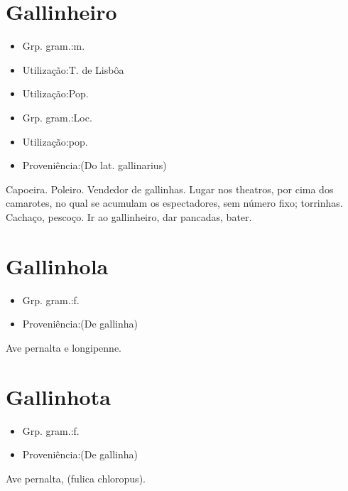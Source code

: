 \section{Gallinheiro}
\begin{itemize}
\item {Grp. gram.:m.}
\end{itemize}
\begin{itemize}
\item {Utilização:T. de Lisbôa}
\end{itemize}
\begin{itemize}
\item {Utilização:Pop.}
\end{itemize}
\begin{itemize}
\item {Grp. gram.:Loc.}
\end{itemize}
\begin{itemize}
\item {Utilização:pop.}
\end{itemize}
\begin{itemize}
\item {Proveniência:(Do lat. \textunderscore gallinarius\textunderscore )}
\end{itemize}
Capoeira.
Poleiro.
Vendedor de gallinhas.
Lugar nos theatros, por cima dos camarotes, no qual se acumulam os espectadores, sem número fixo; torrinhas.
Cachaço, pescoço.
\textunderscore Ir ao gallinheiro\textunderscore , dar pancadas, bater.
\section{Gallinhola}
\begin{itemize}
\item {Grp. gram.:f.}
\end{itemize}
\begin{itemize}
\item {Proveniência:(De \textunderscore gallinha\textunderscore )}
\end{itemize}
Ave pernalta e longipenne.
\section{Gallinhota}
\begin{itemize}
\item {Grp. gram.:f.}
\end{itemize}
\begin{itemize}
\item {Proveniência:(De \textunderscore gallinha\textunderscore )}
\end{itemize}
Ave pernalta, (\textunderscore fulica chloropus\textunderscore ).
